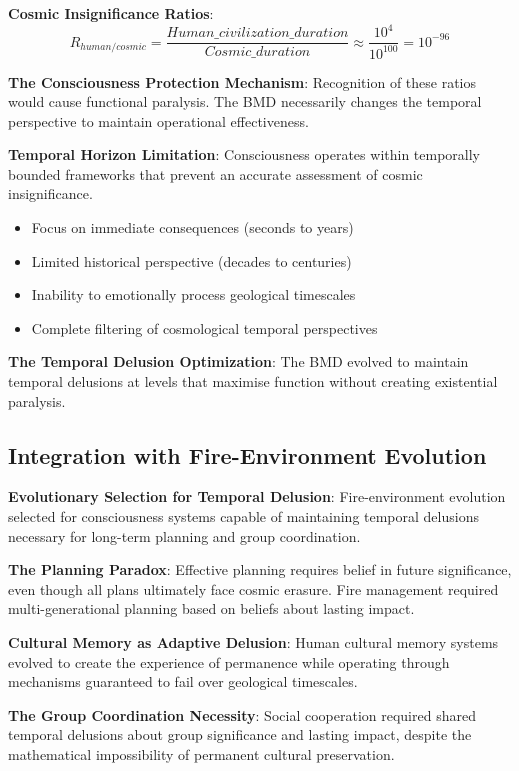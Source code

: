 \documentclass[12pt]{article}
\begin{document}
\textbf{Cosmic Insignificance Ratios}:
$$R_{human/cosmic} = \frac{Human\_civilization\_duration}{Cosmic\_duration} \approx \frac{10^4}{10^{100}} = 10^{-96}$$

\textbf{The Consciousness Protection Mechanism}: Recognition of these ratios would cause functional paralysis. The BMD necessarily changes the temporal perspective to maintain operational effectiveness.

\textbf{Temporal Horizon Limitation}: Consciousness operates within temporally bounded frameworks that prevent an accurate assessment of cosmic insignificance.
\begin{itemize}
\item Focus on immediate consequences (seconds to years)
\item Limited historical perspective (decades to centuries)  
\item Inability to emotionally process geological timescales
\item Complete filtering of cosmological temporal perspectives
\end{itemize}

\textbf{The Temporal Delusion Optimization}: The BMD evolved to maintain temporal delusions at levels that maximise function without creating existential paralysis.

\subsection{Integration with Fire-Environment Evolution}

\textbf{Evolutionary Selection for Temporal Delusion}: Fire-environment evolution selected for consciousness systems capable of maintaining temporal delusions necessary for long-term planning and group coordination.

\textbf{The Planning Paradox}: Effective planning requires belief in future significance, even though all plans ultimately face cosmic erasure. Fire management required multi-generational planning based on beliefs about lasting impact.

\textbf{Cultural Memory as Adaptive Delusion}: Human cultural memory systems evolved to create the experience of permanence while operating through mechanisms guaranteed to fail over geological timescales.

\textbf{The Group Coordination Necessity}: Social cooperation required shared temporal delusions about group significance and lasting impact, despite the mathematical impossibility of permanent cultural preservation.
\end{document}
